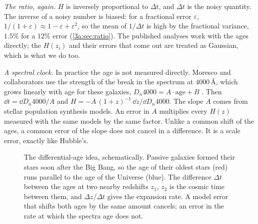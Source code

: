 \emph{The ratio, again.} $H$ is inversely proportional to $\Delta t$, and $\Delta t$ is the
noisy quantity. The inverse of a noisy number is biased: for a fractional error
$\varepsilon$, $1/(1+\varepsilon)\approx1-\varepsilon+\varepsilon^2$, so the mean of $1/\Delta t$ is high by
the fractional variance, $1.5\%$ for a $12\%$ error (\cref{3a:sec:ratio}). The published
analyses work with the ages directly; the $H(z_i)$ and their errors that come out are
treated as Gaussian, which is what we do too.

\emph{A spectral clock.} In practice the age is not measured directly. Moresco and
collaborators use the strength of the break in the spectrum at $4000$\,\AA, which grows
linearly with age for these galaxies, $D_n4000=A\cdot\mathrm{age}+B$
\cite[eq.~(2.1)]{Moresco2016}. Then $\dd t=\dd D_n4000/A$ and
$H=-A\,(1+z)^{-1}\,\dd z/\dd D_n4000$. The slope $A$ comes from stellar population
synthesis models. An error in $A$ multiplies every $H(z)$ measured with the same
models by the same factor. Unlike a common shift of the ages, a common error of the
slope does not cancel in a difference. It is a scale error, exactly like Hubble's.

\begin{figure}[htbp]
\centering
{}
\caption{The differential-age idea, schematically. Passive galaxies formed their
stars soon after the Big Bang, so the age of their oldest stars (red) runs parallel to
the age of the Universe (blue). The difference $\Delta t$ between the ages at two nearby
redshifts $z_1$, $z_2$ is the cosmic time between them, and $\Delta z/\Delta t$ gives the
expansion rate. A model error that shifts both ages by the same amount cancels; an
error in the rate at which the spectra age does not.}
\label{11c:fig:cc-clock}
\end{figure}

